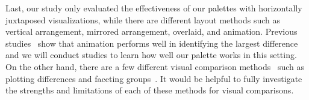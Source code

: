 Last, our study only evaluated the effectiveness of our palettes with horizontally juxtaposed visualizations, while there are different layout methods such as vertical arrangement, mirrored arrangement, overlaid, and animation. Previous studies~\cite{Ondov19} show that animation performs well in identifying the largest difference and we will conduct studies to learn how well our palette works in this setting. On the other hand, there are a few
different visual comparison methods~\cite{Gleicher11} such as plotting differences and faceting groups~\cite{wickham2009elegant}. It would be helpful to fully investigate the strengths and limitations of each of these methods for visual comparisons.


